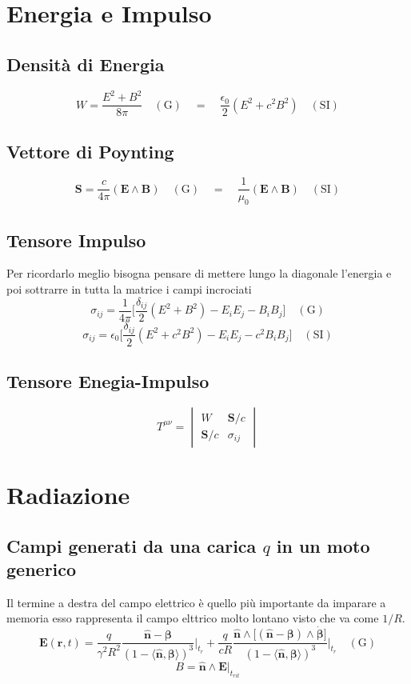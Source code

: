 \documentclass[11pt,a4paper]{report}
\newcommand{\vettore}[1]{\mathbf{#1}}
\newcommand{\pscal}[2]{\langle #1,#2\rangle}
\newcommand{\pvet}[2]{#1\wedge #2}
\begin{document}
	\section{Energia e Impulso}
		\subsection{Densità di Energia}
			\begin{equation}
				W=\frac{E^2+B^2}{8\pi}\quad(\textrm{G})\quad=\quad\frac{\epsilon_0}{2}(E^2+c^2B^2)\quad(\textrm{SI})
			\end{equation}
		\subsection{Vettore di Poynting}
			\begin{equation}
				\vettore S=\frac c{4\pi}(\pvet{\vettore E}{\vettore B})\quad(\textrm{G})\quad=\quad\frac{1}{\mu_0}(\pvet{\vettore E}{\vettore B})\quad(\textrm{SI})
			\end{equation}
		\subsection{Tensore Impulso}
			Per ricordarlo meglio bisogna pensare di mettere lungo la diagonale l'energia e poi sottrarre in tutta la matrice i campi incrociati
			\begin{equation}
				\sigma_{ij}=\frac 1{4\pi}\bigg[\frac{\delta_{ij}}2(E^2+B^2)-E_iE_j-B_iB_j\bigg]\quad(\textrm {G})
			\end{equation}
			\[
				\sigma_{ij}=\epsilon_0\bigg[\frac{\delta_{ij}}2(E^2+c^2B^2)-E_iE_j-c^2B_iB_j\bigg]\quad(\textrm {SI})
			\]
		\subsection{Tensore Enegia-Impulso}
			\begin{equation}
				T^{\mu\nu}=
				\begin{vmatrix}
					W & \vettore S/c\\
					\vettore S/c & \sigma_{ij}
				\end{vmatrix}
			\end{equation}
	\section{Radiazione}
		\subsection{Campi generati da una carica $q$ in un moto generico}
			Il termine a destra del campo elettrico è quello più importante da imparare a memoria esso rappresenta il campo elttrico molto lontano visto che va come $1/R$.
			\begin{equation}
				\vettore E(\vettore r,t)=\frac q{\gamma^2R^2}\frac{\hat{\vettore n}-\vettore \beta}{(1-\pscal{\hat{\vettore n}}{\vettore \beta})^3}\bigg|_{t_r}+
				\frac{q}{cR}
				\frac{\pvet{\hat{\vettore n}}{\big[\pvet{(\hat{\vettore n}-\vettore \beta)}{\dot{\vettore \beta}}\big]}}{(1-\pscal{\hat{\vettore n}}{\vettore \beta})^3}\bigg|_{t_r}\quad(\textrm {G})
			\end{equation}
			\[
				B=\pvet{\hat{\vettore n}}{\vettore E}|_{t_{rit}}
			\]
\end{document}
